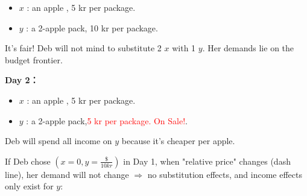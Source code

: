 \documentclass{article}
\begin{document}
\begin{mdframed}[backgroundcolor=blue!20,linecolor=white]
\begin{itemize}
\item $x$ : an apple , 5 kr per package.
\item $y$ : a 2-apple pack, 10 kr per package.
\end{itemize}

It's fair! Deb will not mind to substitute 2 $x$ with 1 $y$. Her demands lie on the budget frontier.

\vspace{2mm}

\textbf{Day 2：}

\begin{itemize}
\item $x$ : an apple , 5 kr per package.
\item $y$ : a 2-apple pack,\textcolor{red}{5 kr per package. On Sale!}.
\end{itemize}

\begin{center}
\label{fig:fair}
\end{center}
\vspace{2mm}

Deb will spend all income on $y$ because it's cheaper per apple. 

If Deb chose $(x=0,y=\frac{\$}{10 kr})$ in Day 1, when "relative price" changes (dash line), her demand 
will not change $\Rightarrow$ no substitution effects, and income effects only exist for $y$:


\end{mdframed}
\end{document}
